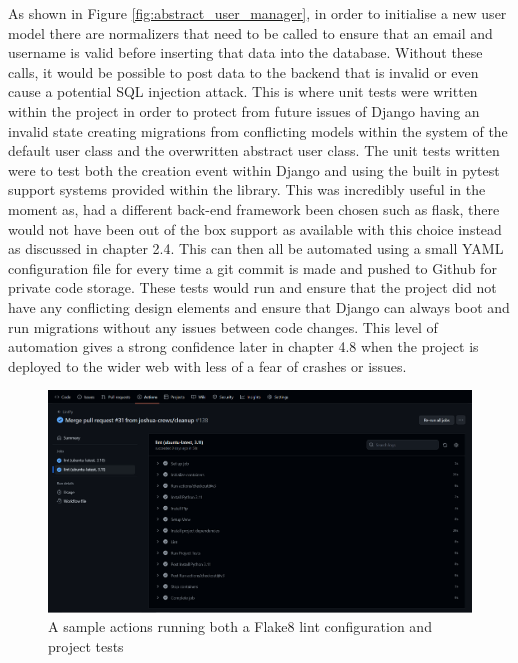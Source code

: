 As shown in Figure \ref{fig:abstract_user_manager}, in order to initialise a new user model there are normalizers that need to be called to ensure that an email and username is valid before inserting that data into the database. Without these calls, it would be possible to post data to the backend that is invalid or even cause a potential SQL injection attack. This is where unit tests were written within the project in order to protect from future issues of Django having an invalid state creating migrations from conflicting models within the system of the default user class and the overwritten abstract user class. The unit tests written were to test both the creation event within Django and using the built in pytest support systems provided within the library. This was incredibly useful in the moment as, had a different back-end framework been chosen such as flask, there would not have been out of the box support as available with this choice instead as discussed in chapter 2.4. This can then all be automated using a small YAML configuration file for every time a git commit is made and pushed to Github for private code storage. These tests would run and ensure that the project did not have any conflicting design elements and ensure that Django can always boot and run migrations without any issues between code changes. This level of automation gives a strong confidence later in chapter 4.8 when the project is deployed to the wider web with less of a fear of crashes or issues.

\pagebreak
\begin{figure}[ht]
\centering
\includegraphics[width=15cm]{images/githubActions.png}
\caption{A sample actions running both a Flake8 lint configuration and project tests}
\label{fig:pipeline}
\end{figure}


